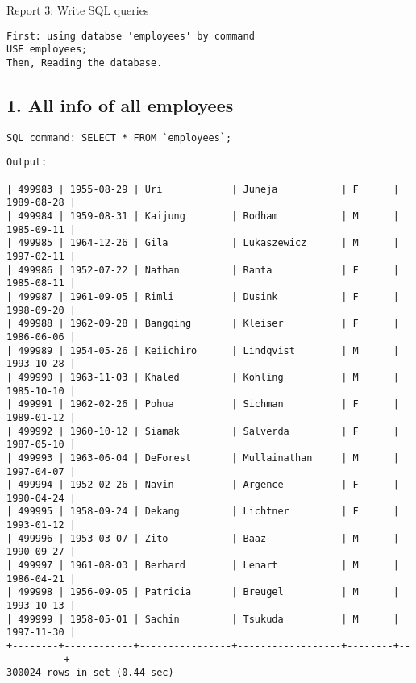 \documentclass{report}
\begin{document}
\begin{center}
Report 3: Write SQL queries
\end{center}
\begin{lstlisting}
First: using databse 'employees' by command
USE employees;
Then, Reading the database.
\end{lstlisting}
\subsection*{1. All info of all employees}
\begin{lstlisting}
SQL command: SELECT * FROM `employees`;
\end{lstlisting}
\begin{lstlisting}
Output:

| 499983 | 1955-08-29 | Uri            | Juneja           | F      | 1989-08-28 |
| 499984 | 1959-08-31 | Kaijung        | Rodham           | M      | 1985-09-11 |
| 499985 | 1964-12-26 | Gila           | Lukaszewicz      | M      | 1997-02-11 |
| 499986 | 1952-07-22 | Nathan         | Ranta            | F      | 1985-08-11 |
| 499987 | 1961-09-05 | Rimli          | Dusink           | F      | 1998-09-20 |
| 499988 | 1962-09-28 | Bangqing       | Kleiser          | F      | 1986-06-06 |
| 499989 | 1954-05-26 | Keiichiro      | Lindqvist        | M      | 1993-10-28 |
| 499990 | 1963-11-03 | Khaled         | Kohling          | M      | 1985-10-10 |
| 499991 | 1962-02-26 | Pohua          | Sichman          | F      | 1989-01-12 |
| 499992 | 1960-10-12 | Siamak         | Salverda         | F      | 1987-05-10 |
| 499993 | 1963-06-04 | DeForest       | Mullainathan     | M      | 1997-04-07 |
| 499994 | 1952-02-26 | Navin          | Argence          | F      | 1990-04-24 |
| 499995 | 1958-09-24 | Dekang         | Lichtner         | F      | 1993-01-12 |
| 499996 | 1953-03-07 | Zito           | Baaz             | M      | 1990-09-27 |
| 499997 | 1961-08-03 | Berhard        | Lenart           | M      | 1986-04-21 |
| 499998 | 1956-09-05 | Patricia       | Breugel          | M      | 1993-10-13 |
| 499999 | 1958-05-01 | Sachin         | Tsukuda          | M      | 1997-11-30 |
+--------+------------+----------------+------------------+--------+------------+
300024 rows in set (0.44 sec)

\end{lstlisting}
\end{document}
